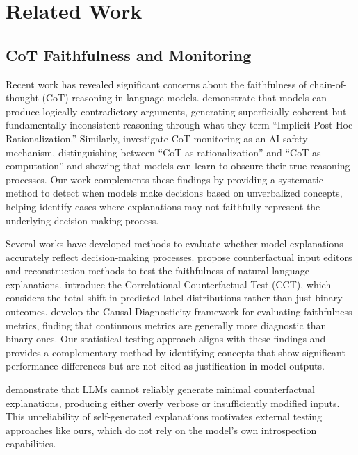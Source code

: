 \section{Related Work}

\subsection{CoT Faithfulness and Monitoring}

Recent work has revealed significant concerns about the faithfulness of chain-of-thought (CoT) reasoning in language models. \citet{cot-wild-2025} demonstrate that models can produce logically contradictory arguments, generating superficially coherent but fundamentally inconsistent reasoning through what they term ``Implicit Post-Hoc Rationalization.'' Similarly, \citet{cot-monitors-2025} investigate CoT monitoring as an AI safety mechanism, distinguishing between ``CoT-as-rationalization'' and ``CoT-as-computation'' and showing that models can learn to obscure their true reasoning processes. Our work complements these findings by providing a systematic method to detect when models make decisions based on unverbalized concepts, helping identify cases where explanations may not faithfully represent the underlying decision-making process.

Several works have developed methods to evaluate whether model explanations accurately reflect decision-making processes. \citet{faithfulness-tests-2023} propose counterfactual input editors and reconstruction methods to test the faithfulness of natural language explanations. \citet{probabilities-matter-2024} introduce the Correlational Counterfactual Test (CCT), which considers the total shift in predicted label distributions rather than just binary outcomes. \citet{causal-lens-2025} develop the Causal Diagnosticity framework for evaluating faithfulness metrics, finding that continuous metrics are generally more diagnostic than binary ones. Our statistical testing approach aligns with these findings and provides a complementary method by identifying concepts that show significant performance differences but are not cited as justification in model outputs.

\citet{llm-decision-boundaries-2025} demonstrate that LLMs cannot reliably generate minimal counterfactual explanations, producing either overly verbose or insufficiently modified inputs. This unreliability of self-generated explanations motivates external testing approaches like ours, which do not rely on the model's own introspection capabilities.

